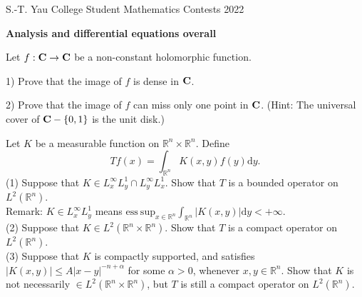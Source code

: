 \documentclass[12pt]{article}
\begin{document}
\begin{center}
S.-T. Yau College Student Mathematics Contests 2022\\

\vspace{0.1cm}

\Large {\bf Analysis and differential equations overall}

\vspace{0.1cm}




\end{center}

\vskip 1cm


 Let $f: {\bf C} \rightarrow {\bf C}$ be a non-constant holomorphic function.

1) Prove that the image of $f$ is dense in ${\bf C}$.

2) Prove that the image of $f$ can miss only one point in ${\bf C}$.
   (Hint: The universal cover of ${\bf C} -\{0, 1\}$ is the unit disk.)

\bigskip

  Let $K$ be a measurable function on $\mathbb{R}^n\times \mathbb{R}^n$. Define
$$Tf(x)=\int_{\mathbb{R}^n} K(x,y)f(y)\mathrm{d}y.$$
(1) Suppose that $K\in L^\infty_x L^1_y\cap L^\infty_yL^1_x$. Show that $T$ is a bounded operator on $L^2(\mathbb{R}^n)$.\\
Remark: $K\in L^\infty_x L^1_y$ means $\mathrm{ess\ sup}_{x\in\mathbb{R}^n}\int_{\mathbb{R}^n}|K(x,y)|\mathrm{d}y<+\infty$.\\
(2) Suppose that $K\in L^2(\mathbb{R}^n\times\mathbb{R}^n)$. Show that $T$ is a compact operator on $L^2(\mathbb{R}^n)$. \\
(3) Suppose that $K$ is compactly supported, and satisfies $|K(x,y)|\le A|x-y|^{-n+\alpha}$ for some $\alpha>0$, whenever $x,y\in\mathbb{R}^n$. Show that $K$ is not necessarily $\in L^2(\mathbb{R}^n\times\mathbb{R}^n)$, but  $T$ is still a compact operator on $L^2(\mathbb{R}^n)$.

\bigskip
\end{document}
